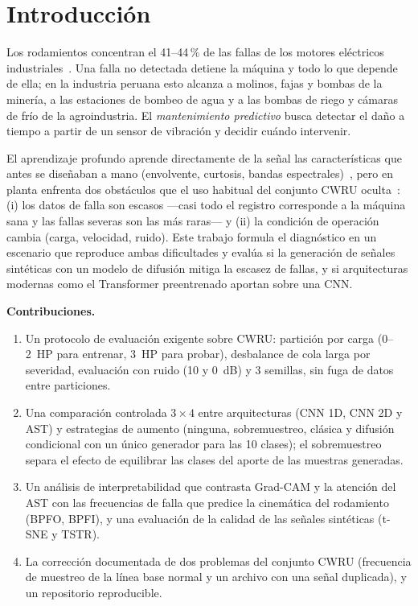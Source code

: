 \documentclass[conference]{IEEEtran}
\begin{document}
\section{Introducción}
Los rodamientos concentran el 41--44\,\% de las fallas de los motores eléctricos industriales~\cite{ieee1985motor}. Una falla no detectada detiene la máquina y todo lo que depende de ella; en la industria peruana esto alcanza a molinos, fajas y bombas de la minería, a las estaciones de bombeo de agua y a las bombas de riego y cámaras de frío de la agroindustria. El \emph{mantenimiento predictivo} busca detectar el daño a tiempo a partir de un sensor de vibración y decidir cuándo intervenir.

El aprendizaje profundo aprende directamente de la señal las características que antes se diseñaban a mano (envolvente, curtosis, bandas espectrales)~\cite{randall2011tutorial,zhao2020benchmark}, pero en planta enfrenta dos obstáculos que el uso habitual del conjunto CWRU oculta~\cite{smith2015cwru,neupane2020review}: (i) los datos de falla son escasos ---casi todo el registro corresponde a la máquina sana y las fallas severas son las más raras--- y (ii) la condición de operación cambia (carga, velocidad, ruido). Este trabajo formula el diagnóstico en un escenario que reproduce ambas dificultades y evalúa si la generación de señales sintéticas con un modelo de difusión mitiga la escasez de fallas, y si arquitecturas modernas como el Transformer preentrenado aportan sobre una CNN.

\textbf{Contribuciones.}
\begin{enumerate}
\item Un protocolo de evaluación exigente sobre CWRU: partición por carga (0--2~HP para entrenar, 3~HP para probar), desbalance de cola larga por severidad, evaluación con ruido (10 y 0~dB) y 3 semillas, sin fuga de datos entre particiones.
\item Una comparación controlada $3\times4$ entre arquitecturas (CNN 1D, CNN 2D y AST) y estrategias de aumento (ninguna, sobremuestreo, clásica y difusión condicional con un único generador para las 10 clases); el sobremuestreo separa el efecto de equilibrar las clases del aporte de las muestras generadas.
\item Un análisis de interpretabilidad que contrasta Grad-CAM y la atención del AST con las frecuencias de falla que predice la cinemática del rodamiento (BPFO, BPFI), y una evaluación de la calidad de las señales sintéticas (t-SNE y TSTR).
\item La corrección documentada de dos problemas del conjunto CWRU (frecuencia de muestreo de la línea base normal y un archivo con una señal duplicada), y un repositorio reproducible.
\end{enumerate}
\end{document}
